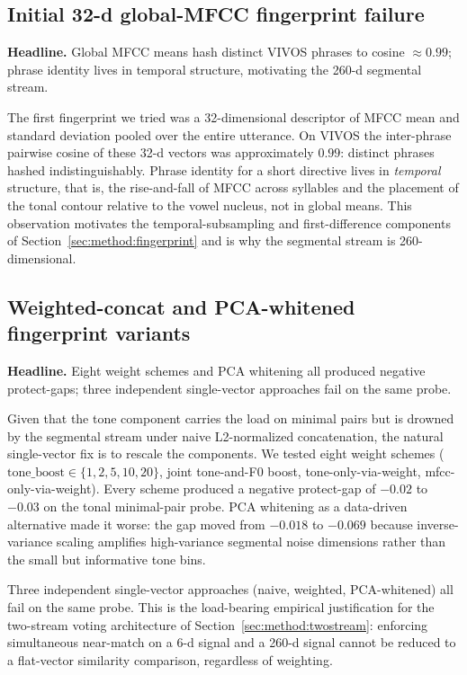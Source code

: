 \documentclass[a4paper,fleqn]{cas-dc}
\begin{document}
\subsection{Initial 32-d global-MFCC fingerprint failure}\label{sec:lim:globalmfcc}
\textbf{Headline.} Global MFCC means hash distinct VIVOS phrases to cosine $\approx 0.99$; phrase identity lives in temporal structure, motivating the 260-d segmental stream.

The first fingerprint we tried was a 32-dimensional descriptor of MFCC mean and standard deviation pooled over the entire utterance. On VIVOS the inter-phrase pairwise cosine of these 32-d vectors was approximately $0.99$: distinct phrases hashed indistinguishably. Phrase identity for a short directive lives in \emph{temporal} structure, that is, the rise-and-fall of MFCC across syllables and the placement of the tonal contour relative to the vowel nucleus, not in global means. This observation motivates the temporal-subsampling and first-difference components of Section~\ref{sec:method:fingerprint} and is why the segmental stream is 260-dimensional.

\subsection{Weighted-concat and PCA-whitened fingerprint variants}\label{sec:lim:weighted}
\textbf{Headline.} Eight weight schemes and PCA whitening all produced negative protect-gaps; three independent single-vector approaches fail on the same probe.

Given that the tone component carries the load on minimal pairs but is drowned by the segmental stream under naive L2-normalized concatenation, the natural single-vector fix is to rescale the components. We tested eight weight schemes ($\mathrm{tone\_boost} \in \{1, 2, 5, 10, 20\}$, joint tone-and-F0 boost, tone-only-via-weight, mfcc-only-via-weight). Every scheme produced a negative protect-gap of $-0.02$ to $-0.03$ on the tonal minimal-pair probe. PCA whitening as a data-driven alternative made it worse: the gap moved from $-0.018$ to $-0.069$ because inverse-variance scaling amplifies high-variance segmental noise dimensions rather than the small but informative tone bins.

Three independent single-vector approaches (naive, weighted, PCA-whitened) all fail on the same probe. This is the load-bearing empirical justification for the two-stream voting architecture of Section~\ref{sec:method:twostream}: enforcing simultaneous near-match on a 6-d signal and a 260-d signal cannot be reduced to a flat-vector similarity comparison, regardless of weighting.
\end{document}
